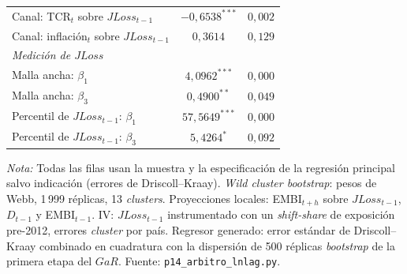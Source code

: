 \begin{table}[htbp]
\begin{tabular}{lcc}
Canal: TCR$_t$ sobre $JLoss_{t-1}$ & $-0{,}6538^{***}$ & $0{,}002$ \\
Canal: inflación$_t$ sobre $JLoss_{t-1}$ & $0{,}3614$ & $0{,}129$ \\
\multicolumn{3}{l}{\textit{Medición de $JLoss$}} \\
Malla ancha: $\beta_1$ & $4{,}0962^{***}$ & $0{,}000$ \\
Malla ancha: $\beta_3$ & $0{,}4900^{**}$ & $0{,}049$ \\
Percentil de $JLoss_{t-1}$: $\beta_1$ & $57{,}5649^{***}$ & $0{,}000$ \\
Percentil de $JLoss_{t-1}$: $\beta_3$ & $5{,}4264^{*}$ & $0{,}092$ \\
\bottomrule
\end{tabular}
\par\smallskip\parbox{0.92\linewidth}{\scriptsize \textit{Nota:} Todas las filas usan la muestra y la especificación de la regresión principal salvo indicación (errores de Driscoll--Kraay). \textit{Wild cluster bootstrap}: pesos de Webb, 1\,999 réplicas, 13 \textit{clusters}. Proyecciones locales: EMBI$_{t+h}$ sobre $JLoss_{t-1}$, $D_{t-1}$ y EMBI$_{t-1}$. IV: $JLoss_{t-1}$ instrumentado con un \textit{shift-share} de exposición pre-2012, errores \textit{cluster} por país. Regresor generado: error estándar de Driscoll--Kraay combinado en cuadratura con la dispersión de 500 réplicas \textit{bootstrap} de la primera etapa del $GaR$. Fuente: \texttt{p14\_arbitro\_lnlag.py}.}
\end{table}

